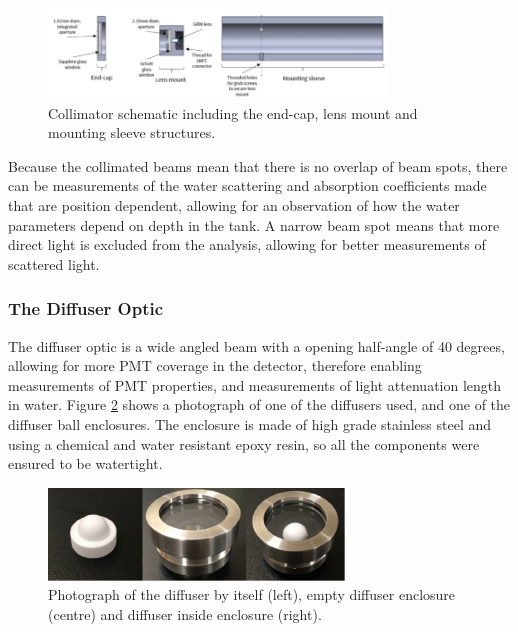 \begin{figure}
    \centering
    \includegraphics[width=0.8\textwidth]{Figures/collimator_schematic.png}
    \caption{Collimator schematic including the end-cap, lens mount and mounting sleeve structures.}
    \label{fig:collimator_schematic}
\end{figure}

 Because the collimated beams mean that there is no overlap of beam spots, there can be measurements of the water scattering and absorption coefficients made that are position dependent, allowing for an observation of how the water parameters depend on depth in the tank. A narrow beam spot means that more direct light is excluded from the analysis, allowing for better measurements of scattered light.

\subsubsection{The Diffuser Optic}

The diffuser optic is a wide angled beam with a opening half-angle of 40 degrees, allowing for more PMT coverage in the detector, therefore enabling measurements of PMT properties, and measurements of light attenuation length in water. Figure \ref{fig:diffuser_photo} shows a photograph of one of the diffusers used, and one of the diffuser ball enclosures. The enclosure is made of high grade stainless steel and using a chemical and water resistant epoxy resin, so all the components were ensured to be watertight. 

\begin{figure}
    \centering
    \includegraphics[width=0.7\textwidth]{Figures/diffuser_photo.png}
    \caption{Photograph of the diffuser by itself (left), empty diffuser enclosure (centre) and diffuser inside enclosure (right).}
    \label{fig:diffuser_photo}
\end{figure} 

